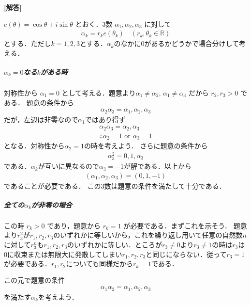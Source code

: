 \documentclass[../../main.tex]{subfiles}
\begin{document}
\begin{oframed}
  
\end{oframed}

{\bf [解答]}

$e(\theta) = \cos\theta + i\sin\theta$ とおく．3数 $\alpha_1, \alpha_2, \alpha_3$ に対して
\begin{align}
  \alpha_k = r_k e(\theta_k) \quad (r_k, \theta_k \in \mathbb{R})
\end{align}
とする．ただし$k=1, 2, 3$とする．$\alpha_k$のなかに$0$があるかどうかで場合分けして考える．

\subparagraph{$\alpha_k=0$なる$k$がある時}

対称性から $\alpha_1=0$ として考える．題意より$\alpha_1 \ne \alpha_2, \, \alpha_1 \ne \alpha_3$ だから $r_2, r_3 > 0$ である．
題意の条件から
\begin{align}
  \alpha_2 \alpha_3 = \alpha_1, \alpha_2, \alpha_3
\end{align}
だが，左辺は非零なので$\alpha_1$ではあり得ず
\begin{align}
  \alpha_2 \alpha_3 = \alpha_2, \alpha_3 \\
  \therefore
  \alpha_2 = 1 \text{ or } \alpha_3 = 1
\end{align}
となる．対称性から$\alpha_2=1$の時を考えよう．
さらに題意の条件から
\begin{align}
  \alpha_3^2 = 0, 1, \alpha_3
\end{align}
である．$\alpha_k$が互いに異なるので$\alpha_3=-1$が解である．以上から
\begin{align}
  (\alpha_1, \alpha_2, \alpha_3) = (0, 1, -1)
\end{align}
であることが必要である．
この3数は題意の条件を満たして十分である．

\subparagraph{全ての$\alpha_k$が非零の場合}

この時 $r_k > 0$ であり，題意から $r_k = 1$ が必要である．まずこれを示そう．
題意より$r_3^2$が$r_1,r_2,r_3$のいずれかに等しいから，これを繰り返し用いて任意の自然数$n$に対して$r_3^n$も$r_1,r_2,r_3$のいずれかに等しい．ところが$r_3\neq 0$より$r_3 \neq 1$の時は$r_3$は$0$に収束または無限大に発散してしまい$r_1,r_2,r_3$と同じにならない．従って$r_3=1$が必要である．$r_1, r_2$についても同様だから$r_k=1$である．

この元で題意の条件
\begin{align}
  \alpha_1 \alpha_2 = \alpha_1, \alpha_2, \alpha_3 \label{eq:1}
\end{align}
を満たす$\alpha_k$を考えよう．
\end{document}
